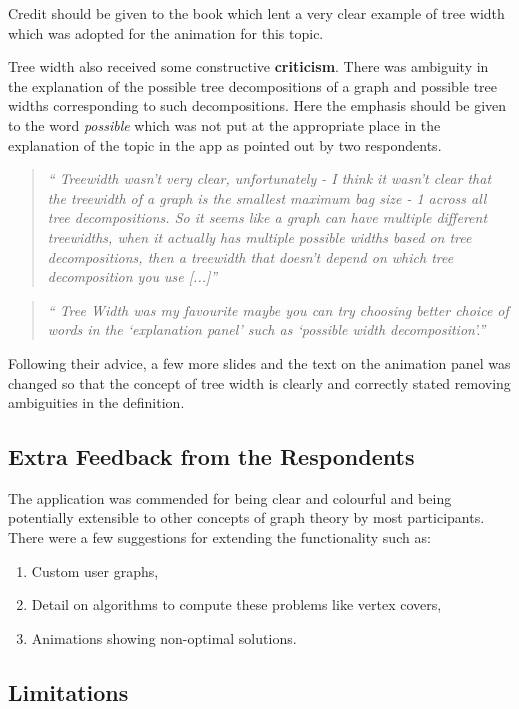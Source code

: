 Credit should be given to the book \cite{KleinbergTardos06} which lent a very
clear example of tree width which was adopted for the animation for this topic.

Tree width also received some constructive \textbf{criticism}. There was
ambiguity in the explanation of the possible tree decompositions of a graph and
possible tree widths corresponding to such decompositions. Here the emphasis
should be given to the word \emph{possible} which was not put at the appropriate
place in the explanation of the topic in the app as pointed out by two respondents.

\begin{quote}
\emph{``
Treewidth wasn't very clear, unfortunately - I think it wasn't clear that the
treewidth of a graph is the smallest maximum bag size - 1 across all tree
decompositions. So it seems like a graph can have multiple different
treewidths, when it actually has multiple possible widths based on tree
decompositions, then a treewidth that doesn't depend on which tree
decomposition you use [...]''}
\end{quote}
\begin{quote}
\emph{``
Tree Width was my favourite maybe
you can try choosing better choice of words in the `explanation panel'  such as
`possible width decomposition'.''}
\end{quote}

Following their advice, a few more slides and the text on the animation panel
was changed so that the concept of tree width is clearly and correctly stated
removing ambiguities in the definition.


\subsection{Extra Feedback from the Respondents}
The application was commended for being clear and colourful and being
potentially extensible to other concepts of graph theory by most participants.
There were a few suggestions for extending the functionality such as:
\begin{enumerate}
\item Custom user graphs,
\item Detail on algorithms to compute these problems like vertex covers,
\item Animations showing non-optimal solutions.
\end{enumerate}


\subsection{Limitations}

